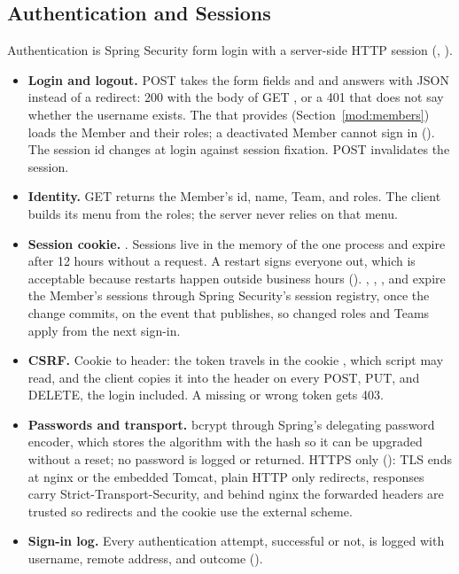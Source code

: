\subsection{Authentication and Sessions}

Authentication is Spring Security form login with a server-side HTTP session (, ).

\begin{itemize}
  \item \textbf{Login and logout.} POST  takes the form fields  and  and answers with JSON instead of a redirect: 200 with the body of GET , or a 401 that does not say whether the username exists. The  that  provides (Section~\ref{mod:members}) loads the Member and their roles; a deactivated Member cannot sign in (). The session id changes at login against session fixation. POST  invalidates the session.
  \item \textbf{Identity.} GET  returns the Member's id, name, Team, and roles. The client builds its menu from the roles; the server never relies on that menu.
  \item \textbf{Session cookie.} . Sessions live in the memory of the one process and expire after 12 hours without a request. A restart signs everyone out, which is acceptable because restarts happen outside business hours (). , , , and  expire the Member's sessions through Spring Security's session registry, once the change commits, on the  event that  publishes, so changed roles and Teams apply from the next sign-in.
  \item \textbf{CSRF.} Cookie to header: the token travels in the cookie , which script may read, and the client copies it into the header  on every POST, PUT, and DELETE, the login included. A missing or wrong token gets 403.
  \item \textbf{Passwords and transport.} bcrypt through Spring's delegating password encoder, which stores the algorithm with the hash so it can be upgraded without a reset; no password is logged or returned. HTTPS only (): TLS ends at nginx or the embedded Tomcat, plain HTTP only redirects, responses carry Strict-Transport-Security, and behind nginx the forwarded headers are trusted so redirects and the  cookie use the external scheme.
  \item \textbf{Sign-in log.} Every authentication attempt, successful or not, is logged with username, remote address, and outcome ().
\end{itemize}

